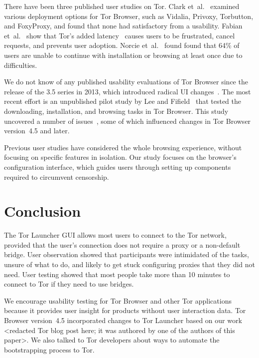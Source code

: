 \documentclass[USenglish,oneside,twocolumn]{article}
\begin{document}
{\color {red} 
There have been three published user studies on Tor. Clark et~al.~\cite{clark2007usability} examined various deployment
options for Tor Browser, such as Vidalia, Privoxy, Torbutton, and FoxyProxy, and found that none had satisfactory from a usability. Fabian et~al.~\cite{fabian2010privately} show that Tor's added
latency~\cite{dingledine2009performance} causes users
to be frustrated, cancel requests, and prevents user adoption. 
Norcie et~al.~\cite{norcie2012eliminating} found found that 
64\% of users are unable to continue with installation or browsing at least once due to difficulties.

We do not know of any published usability evaluations of
Tor Browser since the release of the 3.5 series in 2013, which introduced radical UI changes~\cite{torbrowser-35}.
The most recent effort is an unpublished pilot study by Lee and Fifield~\cite{uxsprint} 
that tested the downloading, installation, and browsing tasks in Tor Browser.  This study uncovered a number of issues~\cite{uxsprint2015-tickets},
some of which influenced changes in Tor Browser version~4.5 and later.

Previous user studies have considered the whole browsing experience,
without focusing on specific features in isolation.
Our study focuses on 
the browser's configuration interface, which guides users through setting up components required to circumvent censorship. 
}

\section{Conclusion} 
\label{sec:conclusion}
The Tor Launcher GUI allows most users to connect to the Tor network, provided that the user's connection does not require a proxy or a non-default bridge. User observation showed that participants were intimidated of the tasks, unsure of what to do, and likely to get stuck configuring proxies that they did not need. User testing showed that most people take more than 10 minutes to connect to Tor if they need to use bridges. 

We encourage usability testing for Tor Browser and other Tor applications because it provides user insight for products without user interaction data. Tor Browser version~4.5 incorporated changes to Tor Launcher based on our work <redacted Tor blog post here; it was authored by one of the authors of this paper>. We also talked to Tor developers about ways to automate the bootstrapping process to Tor. 
\end{document}
